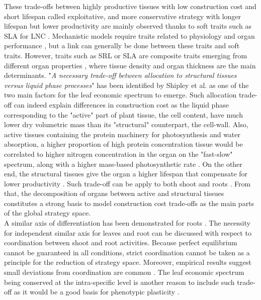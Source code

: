 These trade-offs between highly productive tissues with low construction cost and short lifespan called exploitative, and more conservative strategy with longer lifespan but lower productivity are mainly observed thanks to soft traits such as SLA for LNC \parencite{wright_worldwide_2004}. Mechanistic models require traits related to physiology and organ performance \parencite{soussana_gemini:_2012, lohier_explaining_2014}, but a link can generally be done between these traits and soft traits. However, traits such as SRL or SLA are composite traits emerging from different organ properties \parencite{ryser_importance_1996,john_anatomical_2017}, where tissue density and organ thickness are the main determinants. "\textit{A necessary trade-off between allocation to structural tissues versus liquid phase processes}" has been identified by Shipley et al. \parencite{shipley_fundamental_2006} as one of the two main factors for the leaf economic spectrum to emerge. Such allocation trade-off can indeed explain differences in construction cost as the liquid phase corresponding to the "active" part of plant tissue, the cell content, have much lower dry volumetric mass than its "structural" counterpart, the cell-wall. Also, active tissues containing the protein machinery for photosynthesis and water absorption, a higher proportion of high protein concentration tissue would be correlated to higher nitrogen concentration in the organ on the "fast-slow" spectrum, along with a higher mass-based photosynthetic rate \parencite{reich_world-wide_2014}. On the other end, the structural tissues give the organ a higher lifespan \parencite{mediavilla_internal_2001, ryser_importance_1996} that compensate for lower productivity \parencite{westoby_time_2000}. Such trade-off can be apply to both shoot and roots \parencite{craine_functional_2002,  tjoelker_linking_2005, reich_world-wide_2014}. From that, the decomposition of organs between active and structural tissues constitutes a strong basis to model construction cost trade-offs as the main parts of the global strategy space.\\

A similar axis of differentiation has been demonstrated for roots \parencite{reich_world-wide_2014, tjoelker_linking_2005, picon-cochard_effect_2012}. The necessity for independent similar axis for leaves and root can be discussed with respect to coordination between shoot and root activities. Because perfect equilibrium cannot be guaranteed in all conditions, strict coordination cannot be taken as a principle for the reduction of strategy space. Moreover, empirical results suggest small deviations from coordination are common \parencite{freschet_explaining_2015}. The leaf economic spectrum being conserved at the intra-specific level \parencite{ hu_novel_2015} is another reason to include such trade-off as it would be a good basis for phenotypic plasticity \parencite{freschet_plasticity_2013}.\\


